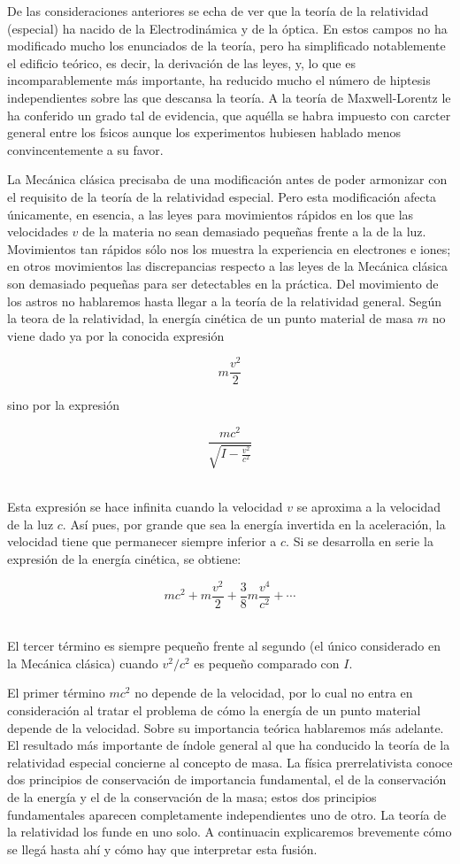 \documentclass[spanish]{book}
\begin{document}
De las consideraciones anteriores se echa de ver que la teoría de la relatividad 
(especial) ha nacido de la Electrodinámica y de la óptica. En estos campos no ha
modificado mucho los enunciados de la teoría, pero ha simplificado notablemente el
edificio teórico, es decir, la derivación de las leyes, y, lo que es incomparablemente
más importante, ha reducido mucho el número de hiptesis independientes sobre las
que descansa la teoría. A la teoría de Maxwell-Lorentz le ha conferido un grado tal de
evidencia, que aquélla se habra impuesto con carcter general entre los fsicos
aunque los experimentos hubiesen hablado menos convincentemente a su favor.

La Mecánica clásica precisaba de una modificación antes de poder armonizar con el
requisito de la teoría de la relatividad especial. Pero esta modificación afecta
únicamente, en esencia, a las leyes para movimientos rápidos en los que las
velocidades $v$ de la materia no sean demasiado pequeñas frente a la de la luz. Movimientos
tan rápidos sólo nos los muestra la experiencia en electrones e iones; en otros
movimientos las discrepancias respecto a las leyes de la Mecánica clásica son
demasiado pequeñas para ser detectables en la práctica. Del movimiento de los astros
no hablaremos hasta llegar a la teoría de la relatividad general. Según la teora de la
relatividad, la energía cinética de un punto material de masa $m$ no viene dado ya por la
conocida expresión

\[m\frac{v^{2}}{2}\]

\noindent sino por la expresión

\[\frac{mc^{2}}{\sqrt{I-\frac{v^{2}}{c^{2}}}}\]
 ~

Esta expresión se hace infinita cuando la velocidad $v$ se aproxima a la velocidad de la
luz $c$. Así pues, por grande que sea la energía invertida en la aceleración, la velocidad
tiene que permanecer siempre inferior a $c$. Si se desarrolla en serie la expresión de la
energía cinética, se obtiene:

\[mc^{2}+m\frac{v^{2}}{2}+\frac{3}{8}m\frac{v^{4}}{c^{2}}+\cdots\]
 ~

El tercer término es siempre pequeño frente al segundo (el único considerado en
la Mecánica clásica) cuando $v^{2}/c^{2}$ es pequeño comparado con $I$.

El primer término $mc^{2}$ no depende de la velocidad, por lo cual no entra
en consideración al tratar el problema de cómo la energía de un punto material
depende de la velocidad. Sobre su importancia teórica hablaremos más adelante. El
resultado más importante de índole general al que ha conducido la teoría de la
relatividad especial concierne al concepto de masa. La física prerrelativista conoce dos
principios de conservación de importancia fundamental, el de la conservación de la
energía y el de la conservación de la masa; estos dos principios fundamentales aparecen
completamente independientes uno de otro. La teoría de la relatividad los funde en
uno solo. A continuacin explicaremos brevemente cómo se llegá hasta ahí y cómo
hay que interpretar esta fusión.
\end{document}

